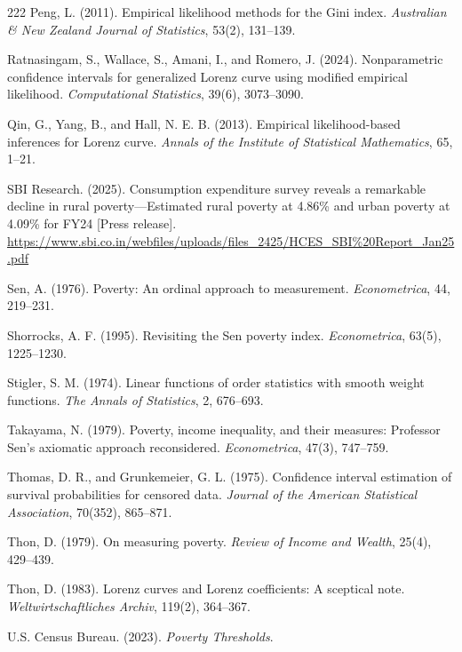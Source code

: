 \documentclass[11pt]{article}
\begin{document}
\begin{thebibliography}{222}
\bibitem{} Peng, L. (2011). Empirical likelihood methods for the Gini index. \emph{Australian \& New Zealand Journal of Statistics}, 53(2), 131--139.

\bibitem{} Ratnasingam, S., Wallace, S., Amani, I., and Romero, J. (2024). Nonparametric confidence intervals for generalized Lorenz curve using modified empirical likelihood. \emph{Computational Statistics}, 39(6), 3073--3090.

 Qin, G., Yang, B., and Hall, N. E. B. (2013). Empirical likelihood-based inferences for Lorenz curve. \emph{Annals of the Institute of Statistical Mathematics}, 65, 1--21.


\bibitem{} SBI Research. (2025). Consumption expenditure survey reveals a remarkable decline in rural poverty—Estimated rural poverty at 4.86\% and urban poverty at 4.09\% for FY24 [Press release]. \url{https://www.sbi.co.in/webfiles/uploads/files_2425/HCES_SBI%20Report_Jan25.pdf}

\bibitem{} Sen, A. (1976). Poverty: An ordinal approach to measurement. \emph{Econometrica}, 44, 219--231.



\bibitem{} Shorrocks, A. F. (1995). Revisiting the Sen poverty index. \emph{Econometrica}, 63(5), 1225--1230.

\bibitem{} Stigler, S. M. (1974). Linear functions of order statistics with smooth weight functions. \emph{The Annals of Statistics}, 2, 676--693.

 Takayama, N. (1979). Poverty, income inequality, and their measures: Professor Sen's axiomatic approach reconsidered. \emph{Econometrica}, 47(3), 747--759.

\bibitem{} Thomas, D. R., and Grunkemeier, G. L. (1975). Confidence interval estimation of survival probabilities for censored data. \emph{Journal of the American Statistical Association}, 70(352), 865--871.

\bibitem{} Thon, D. (1979). On measuring poverty. \emph{Review of Income and Wealth}, 25(4), 429--439.

\bibitem{} Thon, D. (1983). Lorenz curves and Lorenz coefficients: A sceptical note. \emph{Weltwirtschaftliches Archiv}, 119(2), 364--367.

\bibitem{} U.S. Census Bureau. (2023). \emph{Poverty Thresholds}.


\end{thebibliography}
\end{document}
